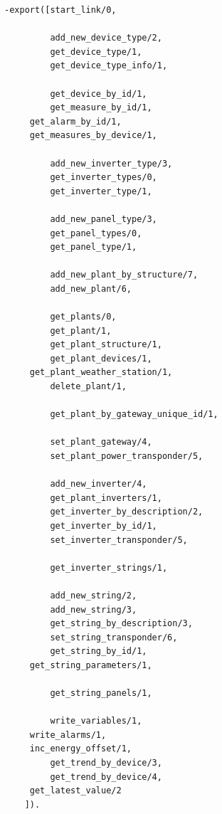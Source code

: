 %
\begin{lstlisting}[caption={Interfaccia del modulo \texttt{data\_storage}}, label={code:data_storage_interface},frame=trBL]
-export([start_link/0,

         add_new_device_type/2,
         get_device_type/1,
         get_device_type_info/1,

         get_device_by_id/1,
         get_measure_by_id/1,
	 get_alarm_by_id/1,
	 get_measures_by_device/1,

         add_new_inverter_type/3,
         get_inverter_types/0,
         get_inverter_type/1,

         add_new_panel_type/3,
         get_panel_types/0,
         get_panel_type/1,

         add_new_plant_by_structure/7,
         add_new_plant/6,

         get_plants/0,
         get_plant/1,
         get_plant_structure/1,
         get_plant_devices/1,
	 get_plant_weather_station/1,
         delete_plant/1,

         get_plant_by_gateway_unique_id/1,

         set_plant_gateway/4,
         set_plant_power_transponder/5,

         add_new_inverter/4,
         get_plant_inverters/1,
         get_inverter_by_description/2,
         get_inverter_by_id/1,
         set_inverter_transponder/5,

         get_inverter_strings/1,

         add_new_string/2,
         add_new_string/3,
         get_string_by_description/3,
         set_string_transponder/6,
         get_string_by_id/1,
	 get_string_parameters/1,

         get_string_panels/1,

         write_variables/1,
	 write_alarms/1,
	 inc_energy_offset/1,
         get_trend_by_device/3,
         get_trend_by_device/4,
	 get_latest_value/2
	]).
\end{lstlisting}
%
